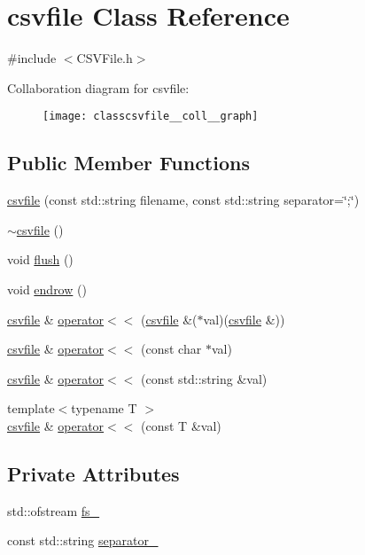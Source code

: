 \hypertarget{classcsvfile}{}\section{csvfile Class Reference}
\label{classcsvfile}


{\ttfamily \#include $<$C\+S\+V\+File.\+h$>$}



Collaboration diagram for csvfile\+:\nopagebreak
\begin{figure}[H]
\begin{center}
\leavevmode
\texttt{[image: classcsvfile\_\_coll\_\_graph]}
\end{center}
\end{figure}
\subsection*{Public Member Functions}
\begin{DoxyCompactItemize}
\item 
\hyperlink{classcsvfile_a22aee506583f5fd125a8f8f3dcccff3b}{csvfile} (const std\+::string filename, const std\+::string separator=\char`\"{};\char`\"{})
\item 
\hyperlink{classcsvfile_ac4a1a4a15b040e0afd25978dc07c2954}{$\sim$csvfile} ()
\item 
void \hyperlink{classcsvfile_a5955a8c1fea1af1c95a388aac391fada}{flush} ()
\item 
void \hyperlink{classcsvfile_afd878cbd74e1be9aa7e33bdf7f70e9ef}{endrow} ()
\item 
\hyperlink{classcsvfile}{csvfile} \& \hyperlink{classcsvfile_aee44e4a9c1826eba97f476ba24572356}{operator$<$$<$} (\hyperlink{classcsvfile}{csvfile} \&($\ast$val)(\hyperlink{classcsvfile}{csvfile} \&))
\item 
\hyperlink{classcsvfile}{csvfile} \& \hyperlink{classcsvfile_a2b9cd9120377c5e325b8d33ac17c7497}{operator$<$$<$} (const char $\ast$val)
\item 
\hyperlink{classcsvfile}{csvfile} \& \hyperlink{classcsvfile_a3850513edbfe4b488cfd4a5bac2f15e6}{operator$<$$<$} (const std\+::string \&val)
\item 
{\footnotesize template$<$typename T $>$ }\\\hyperlink{classcsvfile}{csvfile} \& \hyperlink{classcsvfile_ad00150e1310d31fd4f27801e52a3d7a5}{operator$<$$<$} (const T \&val)
\end{DoxyCompactItemize}
\subsection*{Private Attributes}
\begin{DoxyCompactItemize}
\item 
std\+::ofstream \hyperlink{classcsvfile_af9d64cb504548e6bca5e8bf283ae6b00}{fs\+\_\+}
\item 
const std\+::string \hyperlink{classcsvfile_a93e4acb10aa1213d248b4113c99988ad}{separator\+\_\+}
\end{DoxyCompactItemize}


